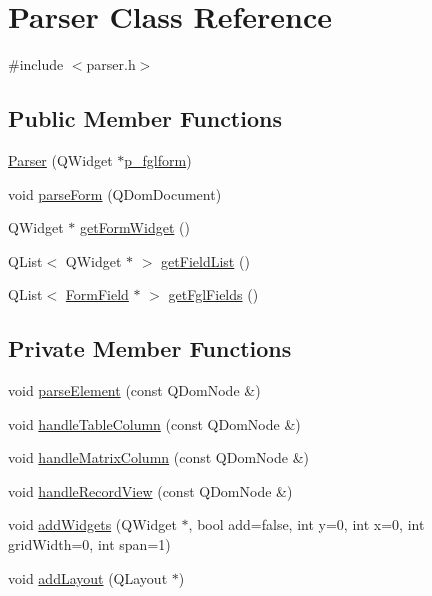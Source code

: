 \hypertarget{classParser}{
\section{Parser Class Reference}
\label{classParser}
}


{\ttfamily \#include $<$parser.h$>$}

\subsection*{Public Member Functions}
\begin{DoxyCompactItemize}
\item 
\hyperlink{classParser_aefe5848f785f24b3e225c19c2164c792}{Parser} (QWidget $\ast$\hyperlink{classParser_a8ae7aeec1e5360fa29b9976624cde0f1}{p\_\-fglform})
\item 
void \hyperlink{classParser_a6df35e9ed4a8615a7224aa51e91a46d3}{parseForm} (QDomDocument)
\item 
QWidget $\ast$ \hyperlink{classParser_a03625492828e17a3e1a540f7a0e07b75}{getFormWidget} ()
\item 
QList$<$ QWidget $\ast$ $>$ \hyperlink{classParser_ae6283c9c8504b6d7ea3f95599b8dfa8d}{getFieldList} ()
\item 
QList$<$ \hyperlink{classFormField}{FormField} $\ast$ $>$ \hyperlink{classParser_a4b4c41ad7831993e9d4cd52468d5fe88}{getFglFields} ()
\end{DoxyCompactItemize}
\subsection*{Private Member Functions}
\begin{DoxyCompactItemize}
\item 
void \hyperlink{classParser_ae02f5da1e3974e81746c91dae0e265a2}{parseElement} (const QDomNode \&)
\item 
void \hyperlink{classParser_a806540a8e1fab811586a5f5df0aead21}{handleTableColumn} (const QDomNode \&)
\item 
void \hyperlink{classParser_a9f4c1bd5465f5abc6587ee66d2a085da}{handleMatrixColumn} (const QDomNode \&)
\item 
void \hyperlink{classParser_afd7f37611e56b353507ebbf79ae0edb5}{handleRecordView} (const QDomNode \&)
\item 
void \hyperlink{classParser_a80b5245c70a7f73fcdba2c61096cc21f}{addWidgets} (QWidget $\ast$, bool add=false, int y=0, int x=0, int gridWidth=0, int span=1)
\item 
void \hyperlink{classParser_a97f0648d8b9a23badc802076b88db7ef}{addLayout} (QLayout $\ast$)
\end{DoxyCompactItemize}
